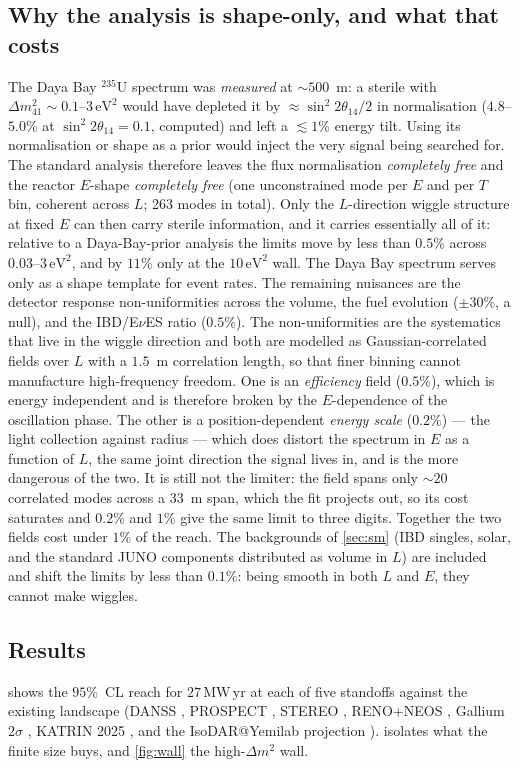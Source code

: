 \documentclass[aps,prd,superscriptaddress,nofootinbib,longbibliography,notitlepage,11pt]{revtex4-2}
\newcommand{\eves}{E$\nu$ES}
\newcommand{\dm}[1]{\Delta m^2_{#1}}
\newcommand{\st}[1]{\sin^2 2\theta_{#1}}
\newcommand{\MWyr}{\mathrm{MW\,yr}}
\begin{document}
\subsection{Why the analysis is shape-only, and what that costs}
The Daya Bay $^{235}$U spectrum was \emph{measured} at $\sim500$~m: a sterile with
$\dm{41}\sim0.1$--$3\,\mathrm{eV^2}$ would have depleted it by $\approx\st{14}/2$ in
normalisation ($4.8$--$5.0\%$ at $\st{14}=0.1$, computed) and left a $\lesssim1\%$ energy
tilt.  Using its normalisation or shape as a prior would inject the very signal being
searched for.  The standard analysis therefore leaves the flux normalisation
\emph{completely free} and the reactor $E$-shape \emph{completely free} (one unconstrained
mode per $E$ and per $T$ bin, coherent across $L$; 263 modes in total).  Only the
$L$-direction wiggle structure at fixed $E$ can then carry sterile information, and it
carries essentially all of it: relative to a Daya-Bay-prior analysis the limits move by
less than $0.5\%$ across $0.03$--$3\,\mathrm{eV^2}$, and by $11\%$ only at the
$10\,\mathrm{eV^2}$ wall.  The Daya Bay spectrum serves only as a shape template for event
rates.  The remaining nuisances are the detector response non-uniformities across the volume, the
fuel evolution ($\pm30\%$, a null), and the IBD/\eves{} ratio ($0.5\%$).  The
non-uniformities are the systematics that live in the wiggle direction and both are
modelled as Gaussian-correlated fields over $L$ with a $1.5$~m correlation length, so that
finer binning cannot manufacture high-frequency freedom.  One is an \emph{efficiency}
field ($0.5\%$), which is energy independent and is therefore broken by the
$E$-dependence of the oscillation phase.  The other is a position-dependent \emph{energy
scale} ($0.2\%$) --- the light collection against radius --- which does distort the
spectrum in $E$ as a function of $L$, the same joint direction the signal lives in, and is
the more dangerous of the two.  It is still not the limiter: the field spans only
$\sim20$ correlated modes across a $33$~m span, which the fit projects out, so its cost
saturates and $0.2\%$ and $1\%$ give the same limit to three digits.  Together the two
fields cost under $1\%$ of the reach.  The backgrounds of \cref{sec:sm} (IBD singles, solar,
and the standard JUNO components distributed as volume in $L$) are included and shift the
limits by less than $0.1\%$: being smooth in both $L$ and $E$, they cannot make wiggles.

\subsection{Results}
 shows the $95\%$~CL reach for $27\,\MWyr$ at each of five standoffs
against the existing landscape (DANSS \cite{DANSS:2018fnn}, PROSPECT
\cite{PROSPECT:2020sxr}, STEREO \cite{STEREO:2022nzk}, RENO+NEOS \cite{RENO:2020hva},
Gallium $2\sigma$ \cite{Barinov:2021asz,Berryman:2021yan}, KATRIN 2025
\cite{KATRIN:2025lph}, and the IsoDAR@Yemilab projection \cite{Alonso:2021jxx}).
 isolates what the finite size buys, and \cref{fig:wall} the high-$\dm{}$
wall.
\end{document}
